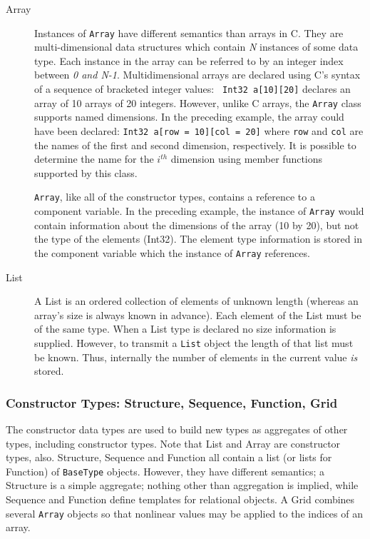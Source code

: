 \begin{description}
  
\item[Array] Instances of {\tt Array} have different semantics than arrays in
  C.  They are multi-dimensional data structures which contain {\em N\/}
  instances of some data type. Each instance in the array can be referred to
  by an integer index between {\em 0 and N-1\/}. Multidimensional arrays are
  declared using C's syntax of a sequence of bracketed integer values: {\tt
    Int32 a[10][20]} declares an array of 10 arrays of 20 integers. However,
  unlike C arrays, the {\tt Array} class supports named dimensions. In the
  preceding example, the array could have been declared: {\tt Int32 a[row =
    10][col = 20]} where {\tt row} and {\tt col} are the names of the first
  and second dimension, respectively. It is possible to determine the name
  for the $i^{th}$ dimension using member functions supported by this class.
  
  {\tt Array}, like all of the constructor types, contains a reference to a
  component variable. In the preceding example, the instance of {\tt Array}
  would contain information about the dimensions of the array (10 by 20), but
  not the type of the elements (Int32). The element type information is
  stored in the component variable which the instance of {\tt Array}
  references.
  
\item[List] A List is an ordered collection of elements of unknown length
  (whereas an array's size is always known in advance). Each element of the
  List must be of the same type. When a List type is declared no size
  information is supplied. However, to transmit a {\tt List} object the
  length of that list must be known.  Thus, internally the number of elements
  in the current value {\em is\/} stored.

\end{description}

\subsubsection{Constructor Types: Structure, Sequence, Function, Grid}

The constructor data types are used to build new types as aggregates of other
types, including constructor types. Note that List and Array are constructor
types, also. Structure, Sequence and Function all contain a list (or lists
for Function) of {\tt BaseType} objects. However, they have different
semantics; a Structure is a simple aggregate; nothing other than aggregation
is implied, while Sequence and Function define templates for relational
objects. A Grid combines several {\tt Array} objects so that nonlinear values
may be applied to the indices of an array.

